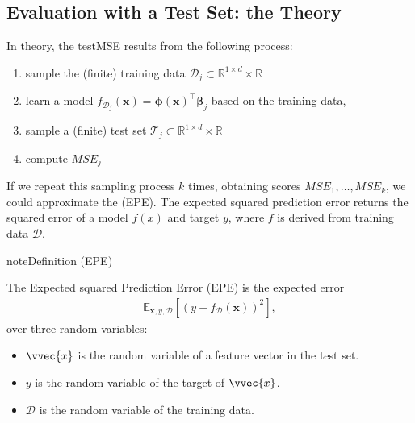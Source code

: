 \documentclass[letterpaper,10pt,english]{jupyterBook}
\begin{document}
\subsection{Evaluation with a Test Set: the Theory}
\label{\detokenize{regression_bias_var:evaluation-with-a-test-set-the-theory}}
\sphinxAtStartPar
In theory, the test\sphinxhyphen{}MSE results from the following process:
\begin{enumerate}
%
\item {} 
\sphinxAtStartPar
sample the (finite) training data \(\mathcal{D}_j\subset\mathbb{R}^{1\times d}\times \mathbb{R}\)

\item {} 
\sphinxAtStartPar
learn a model \(f_{\mathcal{D}_j}(\mathbf{x})=\bm{\phi}(\mathbf{x})^\top \bm{\beta}_j\) based on the training data,

\item {} 
\sphinxAtStartPar
sample a (finite) test set \(\mathcal{T}_j\subset\mathbb{R}^{1\times d}\times \mathbb{R}\)

\item {} 
\sphinxAtStartPar
compute \(MSE_j\)

\end{enumerate}

\sphinxAtStartPar
If we repeat this sampling process \(k\) times, obtaining scores \(MSE_1,\ldots,MSE_k\), we could approximate the  (EPE). The expected squared prediction error returns the squared error of a model \(f(x)\) and target \(y\), where \(f\) is derived from training data \(\mathcal{D}\).
\label{None:definition-0}
\begin{sphinxadmonition}{note}{Definition  (EPE)}



\sphinxAtStartPar
The Expected squared Prediction Error (EPE) is the expected error
\begin{equation*}
\begin{split}\mathbb{E}_{\mathbf{x},y,\mathcal{D}}[(y-f_\mathcal{D}(\mathbf{x}))^2],\end{split}
\end{equation*}
over three random variables:
\begin{itemize}
\item {} 
\sphinxAtStartPar
\(\vvec{x}\) is the random variable of a feature vector in the test set.

\item {} 
\sphinxAtStartPar
\(y\) is the random variable of the target of \(\vvec{x}\).

\item {} 
\sphinxAtStartPar
\(\mathcal{D}\) is the random variable of the training data.

\end{itemize}
\end{sphinxadmonition}
\end{document}
